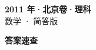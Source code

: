 \documentclass[zihao=-4, a4paper]{ctexart}
\begin{document}
\begin{center}
  {\Large\bfseries 2011 年·北京卷·理科}\\[4pt]
  {\large 数学 · 简答版}
\end{center}
\medskip
{}

\clearpage
{}
\begin{center}{\Large\bfseries 答案速查}\end{center}
\medskip

\end{document}
